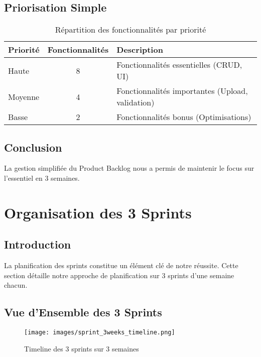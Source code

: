 \subsection{Priorisation Simple}

\begin{table}[H]
    \centering
    \begin{tabularx}{\textwidth}{|l|c|X|}
        \hline
        \textbf{Priorité} & \textbf{Fonctionnalités} & \textbf{Description} \\
        \hline
        Haute & 8 & Fonctionnalités essentielles (CRUD, UI) \\
        \hline
        Moyenne & 4 & Fonctionnalités importantes (Upload, validation) \\
        \hline
        Basse & 2 & Fonctionnalités bonus (Optimisations) \\
        \hline
    \end{tabularx}
    \caption{Répartition des fonctionnalités par priorité}
    \label{tab:priorities}
\end{table}

\subsection{Conclusion}

La gestion simplifiée du Product Backlog nous a permis de maintenir le focus sur l'essentiel en 3 semaines.

\section{Organisation des 3 Sprints}

\subsection{Introduction}

La planification des sprints constitue un élément clé de notre réussite. Cette section détaille notre approche de planification sur 3 sprints d'une semaine chacun.

\subsection{Vue d'Ensemble des 3 Sprints}

\begin{figure}[H]
    \centering
    \texttt{[image: images/sprint\_3weeks\_timeline.png]}
    \caption{Timeline des 3 sprints sur 3 semaines}
    \label{fig:sprint_timeline}
\end{figure}


